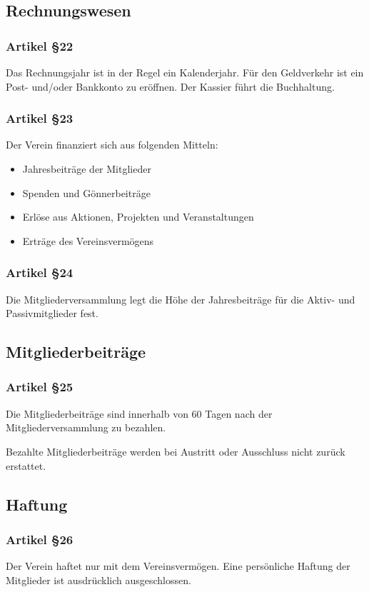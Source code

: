 \documentclass[a4paper,
               10pt,
               fleqn]{article}
\begin{document}
\subsection{Rechnungswesen}

\subsubsection*{Artikel §22}
Das Rechnungsjahr ist in der Regel ein Kalenderjahr. Für
den Geldverkehr ist ein Post- und/oder Bankkonto zu
eröffnen. Der Kassier führt die Buchhaltung.

\subsubsection*{Artikel §23}
Der Verein finanziert sich aus folgenden Mitteln:
\begin{itemize}
\item Jahresbeiträge der Mitglieder
\item Spenden und Gönnerbeiträge
\item Erlöse aus Aktionen, Projekten und Veranstaltungen
\item Erträge des Vereinsvermögens
\end{itemize}
 
\subsubsection*{Artikel §24}
Die Mitgliederversammlung legt die Höhe der Jahresbeiträge 
für die Aktiv- und Passivmitglieder fest.

\subsection{Mitgliederbeiträge}

\subsubsection*{Artikel §25}
Die Mitgliederbeiträge sind innerhalb von 60 Tagen nach der 
Mitgliederversammlung zu bezahlen.

Bezahlte Mitgliederbeiträge werden bei Austritt oder 
Ausschluss nicht zurück erstattet.

\subsection{Haftung}

\subsubsection*{Artikel §26}
Der Verein haftet nur mit dem Vereinsvermögen. Eine
persönliche Haftung der Mitglieder ist ausdrücklich
ausgeschlossen.
\end{document}
